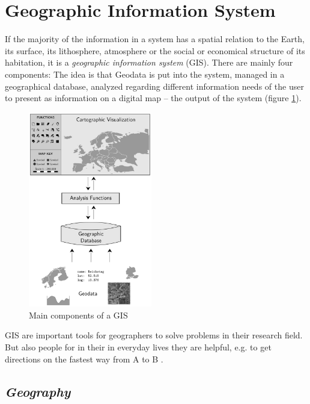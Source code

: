 


\section{Geographic Information System} %
\label{sec:geographic_information_system}

If the majority of the information in a system has a spatial relation to the Earth, its surface, its lithosphere, atmosphere or the social or economical structure of its habitation, it is a \emph{geographic information system} (GIS). There are mainly four components: The idea is that Geodata is put into the system, managed in a geographical database, analyzed regarding different information needs of the user to present as information on a digital map -- the output of the system (figure \ref{fig:gis_components}).

\begin{figure}[ht]
  \centering
  \includegraphics[width=0.48\textwidth]{graphics/basics/gis_components}
  \caption{Main components of a GIS}
  \label{fig:gis_components}
\end{figure}

GIS are important tools for geographers to solve problems in their research field. But also people for in their in everyday lives they are helpful, e.g. to get directions on the fastest way from A to B
\cite{ngGeography}.


\subsection{\emph{Geography}} %

